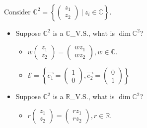 \documentclass[11pt,fleqn]{book} %
\begin{document}
\begin{example}
{~~~}

    Consider $\mathbb{C}^2 = \left\{ \begin{pmatrix} z_1\\z_2 \end{pmatrix} ~|~ z_i \in \mathbb{C} \right\}$. 
    
    \begin{itemize}
        \item Suppose $\mathbb{C}^2$ is a $\mathbb{C}$\_V.S., what is $\dim \mathbb{C}^2$? 
        
        \begin{itemize}
            \item $w\begin{pmatrix} z_1\\z_2 \end{pmatrix} = \begin{pmatrix} wz_1 \\ wz_2\end{pmatrix}, w\in \mathbb{C}$. 

            \item $\mathcal{E} = \left\{ \overrightarrow{e_1} = \begin{pmatrix} 1\\0 \end{pmatrix}, \overrightarrow{e_2}=\begin{pmatrix} 0\\1 \end{pmatrix} \right\}$
        \end{itemize}
        
        \item Suppose $\mathbb{C}^2$ is a $\mathbb{R}$\_V.S., what is $\dim \mathbb{C}^2$? 
        
        \begin{itemize}
            \item $r \begin{pmatrix} z_1\\z_2 \end{pmatrix} = \begin{pmatrix} rz_1 \\ rz_2\end{pmatrix}, r \in \mathbb{R}$. 


\end{itemize}
\end{itemize}
\end{example}
\end{document}
